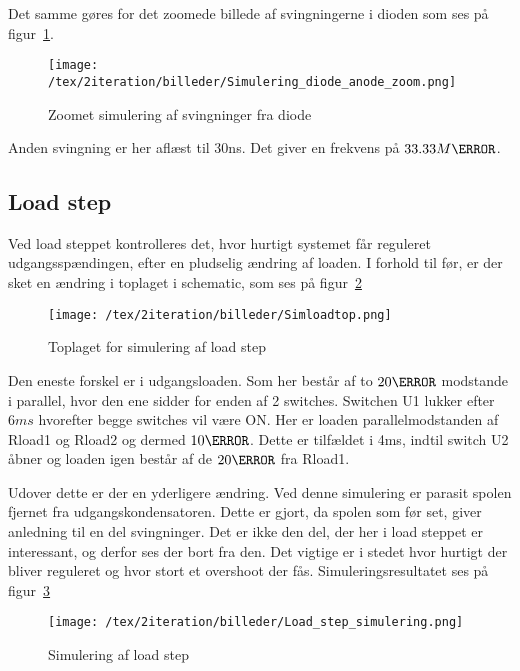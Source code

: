 \noindent Det samme gøres for det zoomede billede af svingningerne i dioden som ses på figur~\ref{fig: simdiodezoom}. 
\begin{figure}[H]
	\center
	\texttt{[image: /tex/2iteration/billeder/Simulering\_diode\_anode\_zoom.png]}
	\caption{Zoomet simulering af svingninger fra diode}
	\label{fig: simdiodezoom}
\end{figure}
\noindent Anden svingning er her aflæst til 30ns. Det giver en frekvens på $33.33M\hertz$.



  

\subsection{Load step} \label{loadstep2ite}
Ved load steppet kontrolleres det, hvor hurtigt systemet får reguleret udgangsspændingen, efter en pludselig ændring af loaden. I forhold til før, er der sket en ændring i toplaget i schematic, som ses på figur~\ref{fig: simloadtop}  
\begin{figure}[H]
	\center
	\texttt{[image: /tex/2iteration/billeder/Simloadtop.png]}
	\caption{Toplaget for simulering af load step}
	\label{fig: simloadtop}
\end{figure}
Den eneste forskel er i udgangsloaden. Som her består af to $20\ohm$ modstande i parallel, hvor den ene sidder for enden af 2 switches. Switchen U1 lukker efter $6ms$ hvorefter begge switches vil være ON. Her er loaden parallelmodstanden af Rload1 og Rload2 og dermed $10\ohm$. Dette er tilfældet i 4ms, indtil switch U2 åbner og loaden igen består af de $20\ohm$ fra Rload1.

Udover dette er der en yderligere ændring. Ved denne simulering er parasit spolen fjernet fra udgangskondensatoren. Dette er gjort, da spolen som før set, giver anledning til en del svingninger. Det er ikke den del, der her i load steppet er interessant, og derfor ses der bort fra den. Det vigtige er i stedet hvor hurtigt der bliver reguleret og hvor stort et overshoot der fås. Simuleringsresultatet ses på figur~\ref{fig: simloadstep} 

\begin{figure}[H]
	\center
	\texttt{[image: /tex/2iteration/billeder/Load\_step\_simulering.png]}
	\caption{Simulering af load step}
	\label{fig: simloadstep}
\end{figure}

